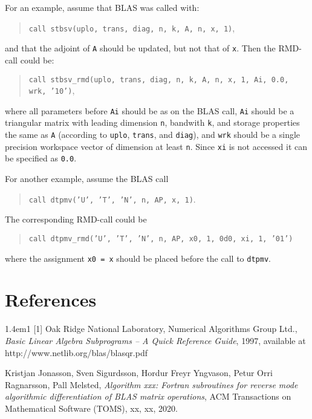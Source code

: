 \documentclass[a4paper]{article}
\begin{document}
For an example, assume that BLAS was called with:

\begin{quote}
  \texttt{call stbsv(uplo, trans, diag, n, k, A, n, x, 1)},
\end{quote}

\noindent
and that the adjoint of \texttt{A} should be updated, but not that of \texttt{x}.
Then the RMD-call could be:

\begin{quote}
  \texttt{call stbsv\_rmd(uplo, trans, diag, n, k, A, n, x, 1, Ai, 0.0, wrk, '10')},
\end{quote}

\noindent
where all parameters before \texttt{Ai} should be as on the BLAS call,
\texttt{Ai} should be a triangular matrix with leading dimension \texttt{n},
bandwith \texttt{k}, and storage properties the same as \texttt{A} (according to
\texttt{uplo}, \texttt{trans}, and \texttt{diag}), and \texttt{wrk} should be a
single precision workspace vector of dimension at least \texttt{n}. Since
\texttt{xi} is not accessed it can be specified as \texttt{0.0}.

For another example, assume the BLAS call

\begin{quote}
  \texttt{call dtpmv('U', 'T', 'N', n, AP, x, 1)}.
\end{quote}

\noindent
The corresponding RMD-call could be

\begin{quote}
  \texttt{call dtpmv\_rmd('U', 'T', 'N', n, AP, x0, 1, 0d0, xi, 1, '01')}
\end{quote}

\noindent
where the assignment \texttt{x0 = x} should be placed before the call to
\texttt{dtpmv}.

\newcommand{\rmdheadS}[1]{
  \subsection{S\uppercase{#1}}
  
}
  
\newcommand{\rmdhead}[1]{
  \pagebreak
  \rmdheadS{#1}
}



\section{References}
\begin{hangparas}{1.4em}{1}
[1] Oak Ridge National Laboratory, Numerical Algorithms Group Ltd., {\it Basic Linear
Algebra Subprograms -- A Quick Reference Guide}, 1997, available at
http://www.netlib.org/blas/blasqr.pdf

\noindent [2] Kristjan Jonasson, Sven Sigurdsson, Hordur Freyr Yngvason, Petur
Orri Ragnarsson, Pall Melsted, {\it Algorithm xxx: Fortran subroutines for
  reverse mode algorithmic differentiation of BLAS matrix operations}, ACM
Transactions on Mathematical Software (TOMS), xx, xx, 2020.

\end{hangparas}
\end{document}
